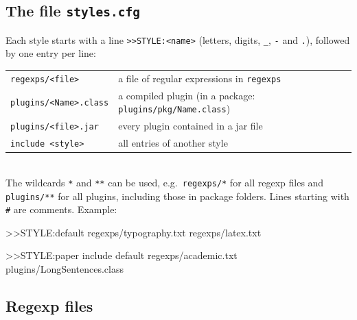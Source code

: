 \documentclass[11pt]{article}
\newcommand{\file}[1]{\texttt{#1}}
\begin{document}
    \subsection{The file \file{styles.cfg}}

    Each style starts with a line \verb+>>STYLE:<name>+ (letters, digits, \verb+_+, \verb+-+ and \verb+.+), followed by one entry per line:\\[2mm]
    \hspace*{1cm}\begin{tabular}{ll}
        \verb+regexps/<file>+ & a file of regular expressions in \file{regexps}\\
        \verb+plugins/<Name>.class+ & a compiled plugin (in a package: \verb+plugins/pkg/Name.class+)\\
        \verb+plugins/<file>.jar+ & every plugin contained in a jar file\\
        \verb+include <style>+ & all entries of another style
    \end{tabular}\\[2mm]
    The wildcards \verb+*+ and \verb+**+ can be used, e.g.\ \verb+regexps/*+ for all regexp files and \verb+plugins/**+ for all plugins, including those in package folders. Lines starting with \verb+#+ are comments. Example:
    \begin{Code}
>>STYLE:default
regexps/typography.txt
regexps/latex.txt

>>STYLE:paper
include default
regexps/academic.txt
plugins/LongSentences.class
    \end{Code}

    \subsection{Regexp files}
\end{document}
